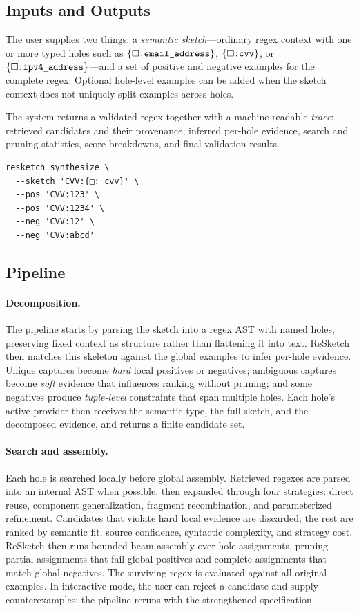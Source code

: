 \documentclass[sigconf,nonacm]{acmart}
\newcommand{\hole}[1]{\ensuremath{\{\square\!:\!\text{\texttt{#1}}\}}}
\begin{document}
\subsection{Inputs and Outputs}
The user supplies two things: a \emph{semantic sketch}---ordinary regex context
with one or more typed holes such as \hole{email\_address}, \hole{cvv}, or
\hole{ipv4\_address}---and a set of positive and negative examples for the
complete regex. Optional hole-level examples can be added when the sketch
context does not uniquely split examples across holes.

The system returns a validated regex together with a machine-readable
\emph{trace}: retrieved candidates and their provenance, inferred per-hole
evidence, search and pruning statistics, score breakdowns, and final
validation results.

\begin{lstlisting}[caption={Example ReSketch invocation.},label={lst:cli}]
resketch synthesize \
  --sketch 'CVV:{□: cvv}' \
  --pos 'CVV:123' \
  --pos 'CVV:1234' \
  --neg 'CVV:12' \
  --neg 'CVV:abcd'
\end{lstlisting}

\subsection{Pipeline}

\paragraph{Decomposition.}
The pipeline starts by parsing the sketch into a regex AST with named holes,
preserving fixed context as structure rather than flattening it into text.
ReSketch then matches this skeleton against the global examples to infer
per-hole evidence. Unique captures become \emph{hard} local positives or
negatives; ambiguous captures become \emph{soft} evidence that influences
ranking without pruning; and some negatives produce \emph{tuple-level}
constraints that span multiple holes. Each hole's active provider then receives
the semantic type, the full sketch, and the decomposed evidence, and returns a
finite candidate set.

\paragraph{Search and assembly.}
Each hole is searched locally before global assembly. Retrieved regexes are
parsed into an internal AST when possible, then expanded through four
strategies: direct reuse, component generalization, fragment recombination, and
parameterized refinement. Candidates that violate hard local evidence are
discarded; the rest are ranked by semantic fit, source confidence, syntactic
complexity, and strategy cost. ReSketch then runs bounded beam assembly over
hole assignments, pruning partial assignments that fail global positives and
complete assignments that match global negatives. The surviving regex is
evaluated against all original examples. In interactive mode, the user can
reject a candidate and supply counterexamples; the pipeline reruns with the
strengthened specification.
\end{document}
